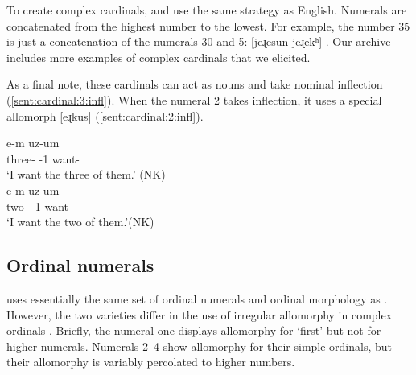	To create complex cardinals, {\iaIA} and {\seaSEA} use the same strategy as English. Numerals are concatenated from the highest number to the lowest. For example, the number 35 is just a concatenation of the numerals 30 and 5: [jeɻesun jeɻekʰ] . Our archive includes more examples of complex cardinals that we elicited. 
	
	
	As a final note, these cardinals can act as nouns and take nominal inflection (\ref{sent:cardinal:3:infl}).   When the numeral 2 takes inflection,  it uses a special allomorph [eɻkus] (\ref{sent:cardinal:2:infl}). 
	
	\begin{exe}
		\ex \begin{xlist}
			\ex {} e-m uz-um
			\\
			three-{} {\auxgloss}-1{\sg} want-{\impfcvb}		\\
			\trans		`I want the three of them.' \label{sent:cardinal:3:infl}\hfill (NK)
			\\
			\ex {} e-m uz-um
			\\
			two-{} {\auxgloss}-1{\sg} want-{\impfcvb}		\\
			\trans		`I want the two of them.'\label{sent:cardinal:2:infl}\hfill (NK)
			\\
		\end{xlist}
	\end{exe}
	\subsection{Ordinal numerals}\label{section:funct:num:ord}
	
	{\iaIA} uses essentially the same set of ordinal numerals and ordinal morphology as {\seaSEA}. However, the two varieties differ in the use of irregular allomorphy in complex ordinals \citep{stump-2010-derivationCompoundOrdinalNumeralImplicationMorphologicalTheory,Dolatian-prep-ordinal}. Briefly, the numeral one displays allomorphy for `first' but not for higher numerals. Numerals 2–4 show allomorphy for their simple ordinals, but their allomorphy is variably percolated to higher numbers.\largerpage 
	
